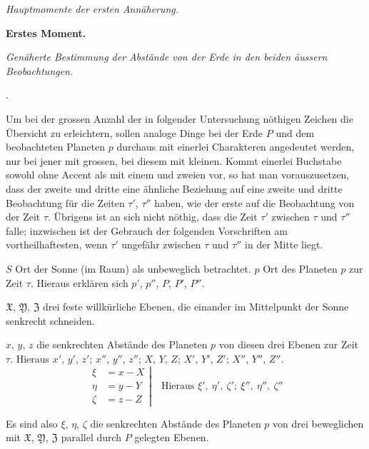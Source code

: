 \begin{center}
\emph{Hauptmomente der ersten Annäherung.}\par\medskip
\textbf{Erstes Moment.}\par\smallskip
{\fontsize{9}{11}\selectfont\emph{Genäherte Bestimmung der Abstände von der Erde in den beiden äussern Beobachtungen.}\par}
.
\end{center}
\par\indent Um bei der grossen Anzahl der in folgender Untersuchung nöthigen Zeichen die Übersicht zu erleichtern, sollen analoge Dinge bei der Erde $P$ und dem beobachteten Planeten $p$ durchaus mit einerlei Charakteren angedeutet werden, nur bei jener mit grossen, bei diesem mit kleinen. Kommt einerlei Buchstabe sowohl ohne Accent als mit einem und zweien vor, so hat man vorauszusetzen, dass der zweite und dritte eine ähnliche Beziehung auf eine zweite und dritte Beobachtung für die Zeiten $\tau'$, $\tau''$ haben, wie der erste auf die Beobachtung von der Zeit $\tau$. Übrigens ist an sich nicht nöthig, dass die Zeit $\tau'$ zwischen $\tau$ und $\tau''$ falle; inzwischen ist der Gebrauch der folgenden Vorschriften am vortheilhaftesten, wenn $\tau'$ ungefähr zwischen $\tau$ und $\tau''$ in der Mitte liegt.

$S$ Ort der Sonne (im Raum) als unbeweglich betrachtet. $p$ Ort des Planeten $p$ zur Zeit $\tau$. Hieraus erklären sich $p'$, $p''$, $P$, $P'$, $P''$.

$\mathfrak{X}$, $\mathfrak{Y}$, $\mathfrak{Z}$ drei feste willkürliche Ebenen, die einander im Mittelpunkt der Sonne senkrecht schneiden.

$x$, $y$, $z$ die senkrechten Abstände des Planeten $p$ von diesen drei Ebenen zur Zeit $\tau$. Hieraus $x'$, $y'$, $z'$; $x''$, $y''$, $z''$; $X$, $Y$, $Z$; $X'$, $Y'$, $Z'$; $X''$, $Y''$, $Z''$.
\[
\left.\begin{aligned}
\xi&=x-X\\
\eta&=y-Y\\
\zeta&=z-Z
\end{aligned}\right|\quad\text{Hieraus }\xi',\ \eta',\ \zeta';\ \xi'',\ \eta'',\ \zeta''
\]

Es sind also $\xi$, $\eta$, $\zeta$ die senkrechten Abstände des Planeten $p$ von drei beweglichen mit $\mathfrak{X}$, $\mathfrak{Y}$, $\mathfrak{Z}$ parallel durch $P$ gelegten Ebenen.

